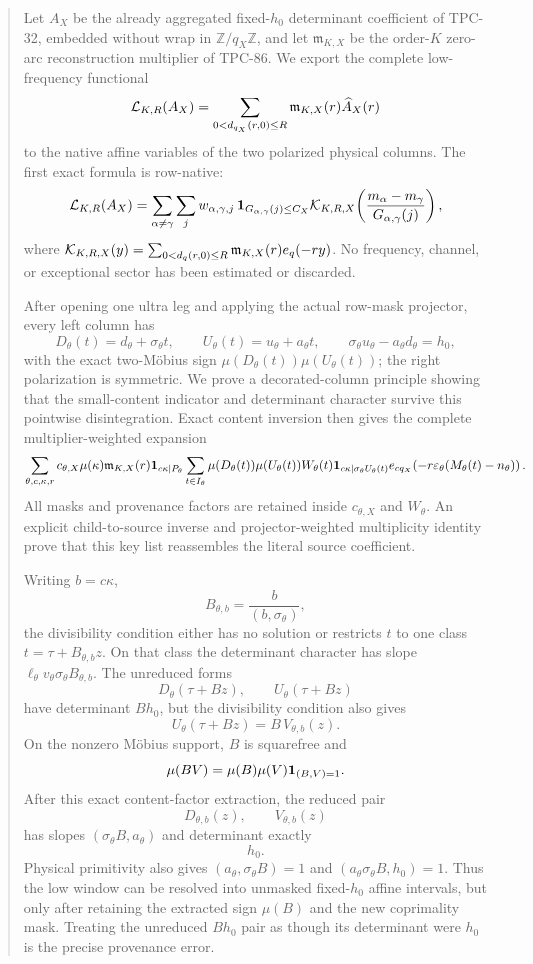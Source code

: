 \begin{abstract}
Let \(A_X\) be the already aggregated fixed-\(h_0\) determinant
coefficient of TPC-32, embedded without wrap in
\(\mathbb Z/q_X\mathbb Z\), and let \(\mathfrak m_{K,X}\) be the
order-\(K\) zero-arc reconstruction multiplier of TPC-86.  We export
the complete low-frequency functional
\[
 \Low_{K,R}(A_X)
 =
 \sum_{0<d_{q_X}(r,0)\le R}
 \mathfrak m_{K,X}(r)\widehat A_X(r)
\]
to the native affine variables of the two polarized physical
columns.  The first exact formula is row-native:
\[
 \Low_{K,R}(A_X)
 =
 \sum_{\alpha\ne\gamma}\sum_j
 w_{\alpha,\gamma,j}\,
 \one_{G_{\alpha,\gamma}(j)\le C_X}
 \Ker_{K,R,X}\!\left(
 \frac{m_\alpha-m_\gamma}{G_{\alpha,\gamma}(j)}\right),
\]
where
\(\Ker_{K,R,X}(y)=\sum_{0<d_q(r,0)\le R}
\mathfrak m_{K,X}(r)e_q(-ry)\).
No frequency, channel, or exceptional sector has been estimated or
discarded.

After opening one ultra leg and applying the actual row-mask
projector, every left column has
\[
 D_\theta(t)=d_\theta+\sigma_\theta t,\qquad
 U_\theta(t)=u_\theta+a_\theta t,\qquad
 \sigma_\theta u_\theta-a_\theta d_\theta=h_0,
\]
with the exact two-M\"obius sign
\(\mu(D_\theta(t))\mu(U_\theta(t))\); the right polarization is
symmetric.  We prove a decorated-column principle showing that the
small-content indicator and determinant character survive this
pointwise disintegration.  Exact content inversion then gives the
complete multiplier-weighted expansion
\[
\sum_{\theta,c,\kappa,r}
 c_{\theta,X}\mu(\kappa)\mathfrak m_{K,X}(r)
 \one_{c\kappa\mid P_\theta}
 \sum_{t\in I_\theta}
 \mu(D_\theta(t))\mu(U_\theta(t))
 W_\theta(t)
 \one_{c\kappa\mid\sigma_\theta U_\theta(t)}
 e_{cq_X}\!\left(
 -r\varepsilon_\theta(M_\theta(t)-n_\theta)\right).
\]
All masks and provenance factors are retained inside
\(c_{\theta,X}\) and \(W_\theta\).  An explicit child-to-source
inverse and projector-weighted multiplicity identity prove that this
key list reassembles the literal source coefficient.

Writing \(b=c\kappa\),
\[
 B_{\theta,b}=\frac{b}{(b,\sigma_\theta)},
\]
the divisibility condition either has no solution or restricts
\(t\) to one class \(t=\tau+B_{\theta,b}z\).  On that class the
determinant character has slope
\(\ell_\theta v_\theta\sigma_\theta B_{\theta,b}\).
The unreduced forms
\[
 D_\theta(\tau+Bz),\qquad U_\theta(\tau+Bz)
\]
have determinant \(Bh_0\), but the divisibility condition also gives
\[
 U_\theta(\tau+Bz)=B\,V_{\theta,b}(z).
\]
On the nonzero M\"obius support, \(B\) is squarefree and
\[
 \mu(BV)=\mu(B)\mu(V)\one_{(B,V)=1}.
\]
After this exact content-factor extraction, the reduced pair
\[
 D_{\theta,b}(z),\qquad V_{\theta,b}(z)
\]
has slopes \((\sigma_\theta B,a_\theta)\) and determinant exactly
\[
 \boxed{h_0.}
\]
Physical primitivity also gives
\((a_\theta,\sigma_\theta B)=1\) and
\((a_\theta\sigma_\theta B,h_0)=1\).  Thus the low window can be
resolved into unmasked fixed-\(h_0\) affine intervals, but only after
retaining the extracted sign \(\mu(B)\) and the new coprimality mask.
Treating the unreduced \(Bh_0\) pair as though its determinant were
\(h_0\) is the precise provenance error.


\end{abstract}
